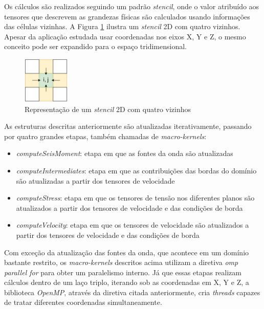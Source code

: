 \documentclass[cic,tc]{iiufrgs}
\begin{document}
Os cálculos são realizados seguindo um padrão \textit{stencil}, onde o valor atribuído aos tensores que descrevem as grandezas físicas são calculados usando informações
das células vizinhas. A Figura \ref{fig:stencil} ilustra um \textit{stencil} 2D com quatro vizinhos. Apesar da aplicação estudada usar coordenadas nos eixos X, Y e Z, o mesmo
conceito pode ser expandido para o espaço tridimensional.

\begin{figure}[!htb]
    \caption{Representação de um \textit{stencil} 2D com quatro vizinhos}
    \begin{center}
      \includegraphics[width=6em]{stencil}
    \end{center}
    \label{fig:stencil}
\end{figure}

As estruturas descritas anteriormente são atualizadas iterativamente, passando por quatro grandes etapas, também chamadas de \textit{macro-kernels}:

\begin{itemize}
\item{\textit{computeSeisMoment}:} etapa em que as fontes da onda são atualizadas
\item{\textit{computeIntermediates}:} etapa em que as contribuições das bordas do domínio são atualizadas a partir dos tensores de velocidade
\item{\textit{computeStress}:} etapa em que os tensores de tensão nos diferentes planos são atualizados a partir dos tensores de velocidade e das condições de borda
\item{\textit{computeVelocity}:} etapa em que os tensores de velocidade são atualizados a partir dos tensores de velocidade e das condições de borda
\end{itemize}

Com exceção da atualização das fontes da onda, que acontece em um domínio bastante restrito, os \textit{macro-kernels} descritos acima utilizam a diretiva \textit{omp parallel for}
para obter um paralelismo interno. Já que essas etapas realizam cálculos dentro de um laço triplo, iterando sob as coordenadas em X, Y e Z, a biblioteca \textit{OpenMP}, através
da diretiva citada anteriormente, cria \textit{threads} capazes de tratar diferentes coordenadas simultaneamente.
\end{document}
